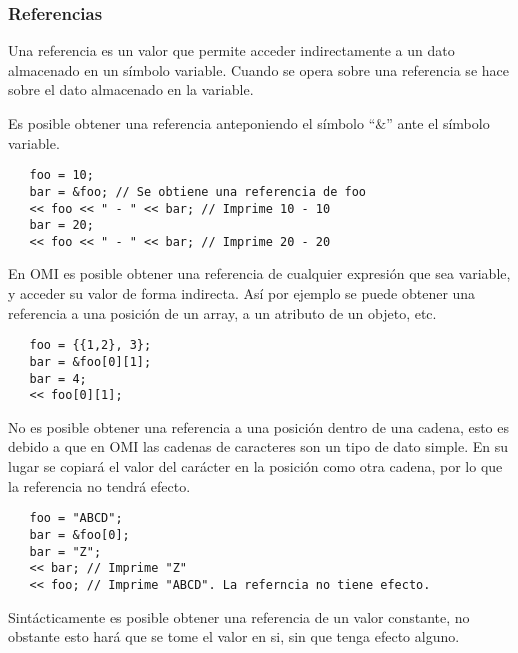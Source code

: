 

\subsubsection{Referencias}
Una referencia es un valor que permite acceder indirectamente a un dato almacenado en un símbolo variable. Cuando 
se opera sobre una referencia se hace sobre el dato almacenado en la variable.

Es posible obtener una referencia anteponiendo el símbolo ``$\&$'' ante el símbolo variable. \\

\begin{lstlisting}
   foo = 10;
   bar = &foo; // Se obtiene una referencia de foo
   << foo << " - " << bar; // Imprime 10 - 10
   bar = 20; 
   << foo << " - " << bar; // Imprime 20 - 20 
\end{lstlisting}

En OMI es posible obtener una referencia de cualquier expresión que sea variable, y acceder su valor de forma indirecta. Así por
ejemplo se puede obtener una referencia a una posición de un array, a un atributo de un objeto, etc. \\

\begin{lstlisting}
   foo = {{1,2}, 3}; 
   bar = &foo[0][1];
   bar = 4;
   << foo[0][1];
\end{lstlisting}

No es posible obtener una referencia a una posición dentro de una cadena, esto es debido a que en OMI las cadenas de caracteres son un tipo de dato simple.  
En su lugar se copiará el valor del carácter en la posición como otra cadena, por lo que la referencia no tendrá efecto. \\

\begin{lstlisting}
   foo = "ABCD"; 
   bar = &foo[0];
   bar = "Z";
   << bar; // Imprime "Z"
   << foo; // Imprime "ABCD". La referncia no tiene efecto.
\end{lstlisting}

Sintácticamente es posible obtener una referencia de un valor constante, no obstante esto hará que se tome el valor en si, sin que tenga efecto alguno.

